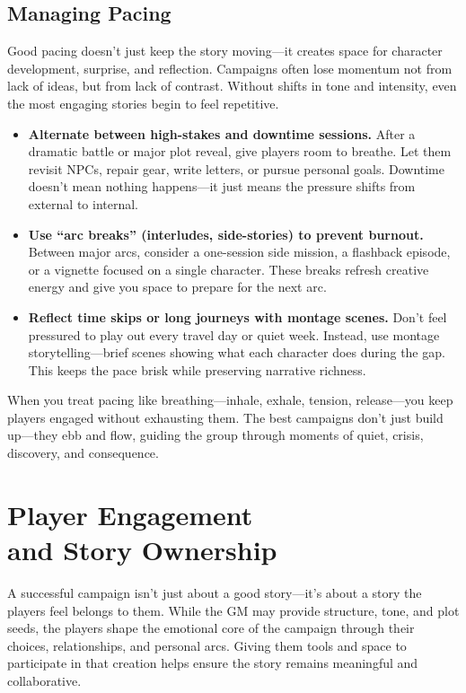 \subsection*{Managing Pacing}

Good pacing doesn’t just keep the story moving—it creates space for character development, surprise, and reflection. Campaigns often lose momentum not from lack of ideas, but from lack of contrast. Without shifts in tone and intensity, even the most engaging stories begin to feel repetitive.

\newcolumn
\begin{itemize}
    \item \textbf{Alternate between high-stakes and downtime sessions.}  
    After a dramatic battle or major plot reveal, give players room to breathe. Let them revisit NPCs, repair gear, write letters, or pursue personal goals. Downtime doesn’t mean nothing happens—it just means the pressure shifts from external to internal.

    \item \textbf{Use “arc breaks” (interludes, side-stories) to prevent burnout.}  
    Between major arcs, consider a one-session side mission, a flashback episode, or a vignette focused on a single character. These breaks refresh creative energy and give you space to prepare for the next arc.

    \item \textbf{Reflect time skips or long journeys with montage scenes.}  
    Don’t feel pressured to play out every travel day or quiet week. Instead, use montage storytelling—brief scenes showing what each character does during the gap. This keeps the pace brisk while preserving narrative richness.
\end{itemize}

When you treat pacing like breathing—inhale, exhale, tension, release—you keep players engaged without exhausting them. The best campaigns don’t just build up—they ebb and flow, guiding the group through moments of quiet, crisis, discovery, and consequence.



\section[Player Engagement and Story Ownership]{Player Engagement\\ and Story Ownership}

A successful campaign isn’t just about a good story—it’s about a story the players feel belongs to them. While the GM may provide structure, tone, and plot seeds, the players shape the emotional core of the campaign through their choices, relationships, and personal arcs. Giving them tools and space to participate in that creation helps ensure the story remains meaningful and collaborative.

